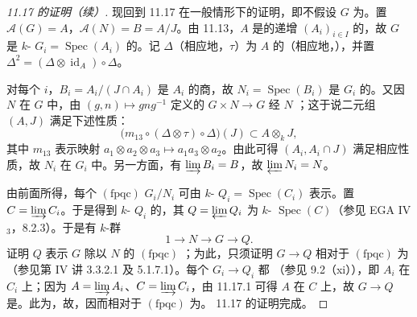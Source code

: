 \begin{proof}[ 11.17 的证明（续）]
现回到 11.17 在一般情形下的证明，即不假设 $G$ 为。置 $\mathcal A(G)=A$，$\mathcal A(N)=B=A/J$。由 11.13，$A$ 是的递增 $(A_i)_{i\in I}$ 的，故 $G$ 是 $k$- $G_i=\operatorname{Spec}(A_i)$ 的。记 $\Delta$（相应地，$\tau$）为 $A$ 的（相应地，），并置 $\Delta^2=(\Delta\otimes\operatorname{id}_A)\circ\Delta$。

对每个 $i$，$B_i=A_i/(J\cap A_i)$ 是 $A_i$ 的商，故 $N_i=\operatorname{Spec}(B_i)$ 是 $G_i$ 的。又因 $N$ 在 $G$ 中，由 $(g,n)\mapsto gng^{-1}$ 定义的 $G\times N\to G$ 经 $N$ ；这于说二元组 $(A,J)$ 满足下述性质：
\[
\bigl(m_{13}\circ(\Delta\otimes\tau)\circ\Delta\bigr)(J)\subset A\otimes_k J,
\]
其中 $m_{13}$ 表示映射 $a_1\otimes a_2\otimes a_3\mapsto a_1a_3\otimes a_2$。由此可得 $(A_i,A_i\cap J)$ 满足相应性质，故 $N_i$ 在 $G_i$ 中。另一方面，有 $\varinjlim B_i=B$，故 $\varprojlim N_i=N$。

由前面所得，每个 $(\mathrm{fpqc})$  $G_i/N_i$ 可由 $k$- $Q_i=\operatorname{Spec}(C_i)$ 表示。置 $C=\varinjlim C_i$。于是得到 $k$- $Q_i$ 的，其 $Q=\varprojlim Q_i$ 为 $k$- $\operatorname{Spec}(C)$（参见 EGA IV$_3$，8.2.3）。于是有 $k$-群
\[
1\longrightarrow N\longrightarrow G\longrightarrow Q.
\]
证明 $Q$ 表示 $G$ 除以 $N$ 的 $(\mathrm{fpqc})$ ；为此，只须证明 $G\to Q$ 相对于 $(\mathrm{fpqc})$ 为（参见第 IV 讲 3.3.2.1 及 5.1.7.1）。每个 $G_i\to Q_i$ 都
（参见 9.2（xi）），即 $A_i$ 在 $C_i$ 上；因为 $A=\varinjlim A_i$、$C=\varinjlim C_i$，由 11.17.1 可得 $A$ 在 $C$ 上，故 $G\to Q$ 是。此为，故，因而相对于 $(\mathrm{fpqc})$ 为。 11.17 的证明完成。
\end{proof}

